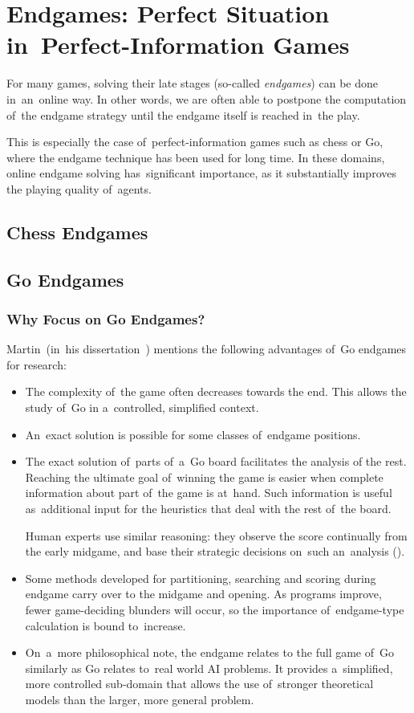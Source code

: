 \chapter{Endgames: Perfect Situation in~Perfect-Information Games}

For many games, solving their late stages (so-called \emph{endgames}) can be done in~an~online way.
In other words, we are often able to postpone the computation of~the endgame strategy until the endgame itself is reached in~the play.

This is especially the case of~perfect-information games such as chess or Go, where the endgame technique has been used for long time.
In these domains, online endgame solving has~significant importance, as it substantially improves the playing quality of~agents.

\section{Chess Endgames}
\todo

\section{Go Endgames}
\todo

\subsection{Why Focus on Go Endgames?}

Martin~\Mueller (in~his dissertation~\cite{Muller1995computer}) mentions the following advantages of~Go endgames for research:
\begin{itemize}
  \item The complexity of~the game often decreases towards the end.
    This allows the study of~Go in a~controlled, simplified context.
  \item An~exact solution is possible for some classes of~endgame positions.
  \item The exact solution of~parts of~a~Go board facilitates the analysis of the rest.
    Reaching the ultimate goal of~winning the game is easier when complete information about part of~the game is at~hand.
    Such information is useful as~additional input for the heuristics that deal with the rest of~the board.

    Human experts use similar reasoning: they observe the score continually from the early midgame, and base their strategic decisions on~such an~analysis (\cite{Takagawa85}).
  \item Some methods developed for partitioning, searching and scoring during endgame carry over to the midgame and opening.
    As programs improve, fewer game-deciding blunders will occur, so the importance of~endgame-type calculation is bound to~increase.
  \item On~a~more philosophical note, the endgame relates to the full game of~Go similarly as Go relates to~real world AI problems.
    It provides a~simplified, more controlled sub-domain that allows the use of~stronger theoretical models than the larger, more general problem.
\end{itemize}

